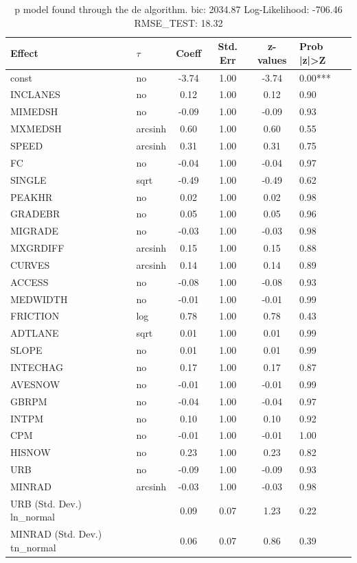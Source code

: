 \begin{table}
	\caption{p model found through the de algorithm. bic: 2034.87 Log-Likelihood: -706.46 RMSE_TEST: 18.32}
	\begin{center}
		\begin{tabular}{|l|l|c|c|c|l|}
			\hline
			Effect & $\tau$ & Coeff & Std. Err & z-values & Prob |z|>Z \\
			\hline
			const & no & -3.74 & 1.00 & -3.74 & 0.00*** \\
			\hline
			INCLANES & no & 0.12 & 1.00 & 0.12 & 0.90 \\
			\hline
			MIMEDSH & no & -0.09 & 1.00 & -0.09 & 0.93 \\
			\hline
			MXMEDSH & arcsinh & 0.60 & 1.00 & 0.60 & 0.55 \\
			\hline
			SPEED & arcsinh & 0.31 & 1.00 & 0.31 & 0.75 \\
			\hline
			FC & no & -0.04 & 1.00 & -0.04 & 0.97 \\
			\hline
			SINGLE & sqrt & -0.49 & 1.00 & -0.49 & 0.62 \\
			\hline
			PEAKHR & no & 0.02 & 1.00 & 0.02 & 0.98 \\
			\hline
			GRADEBR & no & 0.05 & 1.00 & 0.05 & 0.96 \\
			\hline
			MIGRADE & no & -0.03 & 1.00 & -0.03 & 0.98 \\
			\hline
			MXGRDIFF & arcsinh & 0.15 & 1.00 & 0.15 & 0.88 \\
			\hline
			CURVES & arcsinh & 0.14 & 1.00 & 0.14 & 0.89 \\
			\hline
			ACCESS & no & -0.08 & 1.00 & -0.08 & 0.93 \\
			\hline
			MEDWIDTH & no & -0.01 & 1.00 & -0.01 & 0.99 \\
			\hline
			FRICTION & log & 0.78 & 1.00 & 0.78 & 0.43 \\
			\hline
			ADTLANE & sqrt & 0.01 & 1.00 & 0.01 & 0.99 \\
			\hline
			SLOPE & no & 0.01 & 1.00 & 0.01 & 0.99 \\
			\hline
			INTECHAG & no & 0.17 & 1.00 & 0.17 & 0.87 \\
			\hline
			AVESNOW & no & -0.01 & 1.00 & -0.01 & 0.99 \\
			\hline
			GBRPM & no & -0.04 & 1.00 & -0.04 & 0.97 \\
			\hline
			INTPM & no & 0.10 & 1.00 & 0.10 & 0.92 \\
			\hline
			CPM & no & -0.01 & 1.00 & -0.01 & 1.00 \\
			\hline
			HISNOW & no & 0.23 & 1.00 & 0.23 & 0.82 \\
			\hline
			URB & no & -0.09 & 1.00 & -0.09 & 0.93 \\
			\hline
			MINRAD & arcsinh & -0.03 & 1.00 & -0.03 & 0.98 \\
			\hline
			URB (Std. Dev.) ln_normal &  & 0.09 & 0.07 & 1.23 & 0.22 \\
			\hline
			MINRAD (Std. Dev.) tn_normal &  & 0.06 & 0.07 & 0.86 & 0.39 \\
			\hline
		\end{tabular}
	\end{center}
\end{table}